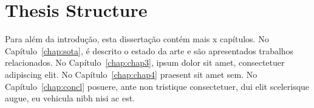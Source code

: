 \section{Thesis Structure} \label{sec:struct}

Para além da introdução, esta dissertação contém mais x capítulos.
No Capítulo~\ref{chap:sota}, é descrito o estado da arte e são
apresentados trabalhos relacionados. 
No Capítulo~\ref{chap:chap3}, ipsum dolor sit amet, consectetuer
adipiscing elit.
No Capítulo~\ref{chap:chap4} praesent sit amet sem. 
No Capítulo~\ref{chap:concl} posuere, ante non tristique
consectetuer, dui elit scelerisque augue, eu vehicula nibh nisi ac
est. 
